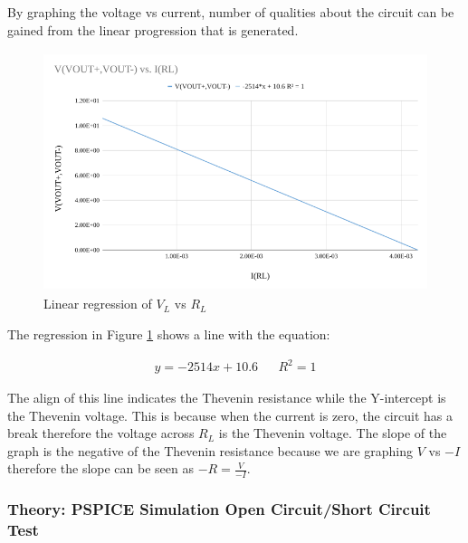 \documentclass[11pt]{article}
\begin{document}
By graphing the voltage vs current, number of qualities about the circuit can be gained from the linear progression that is generated.

\begin{figure}[h!]
	\begin{center}
		\includegraphics[height=7cm]{regression}
		\caption{Linear regression of $V_L$ vs $R_L$}
		\label{Fig:SimulationRegression}
	\end{center}
\end{figure}


The regression in Figure \ref{Fig:SimulationRegression} shows a line with the equation:

\begin{align}
y=-2514x + 10.6 && R^2 = 1
\end{align}

The align of this line indicates the Thevenin resistance while the Y-intercept is the Thevenin voltage. This is because when the current is zero, the circuit has a break therefore the voltage across $R_L$ is the Thevenin voltage. The slope of the graph is the negative of the Thevenin resistance because we are graphing $V$ vs $-I$ therefore the slope can be seen as $-R = \frac{V}{-I}$.

\subsubsection{Theory: PSPICE Simulation Open Circuit/Short Circuit Test}
\end{document}
